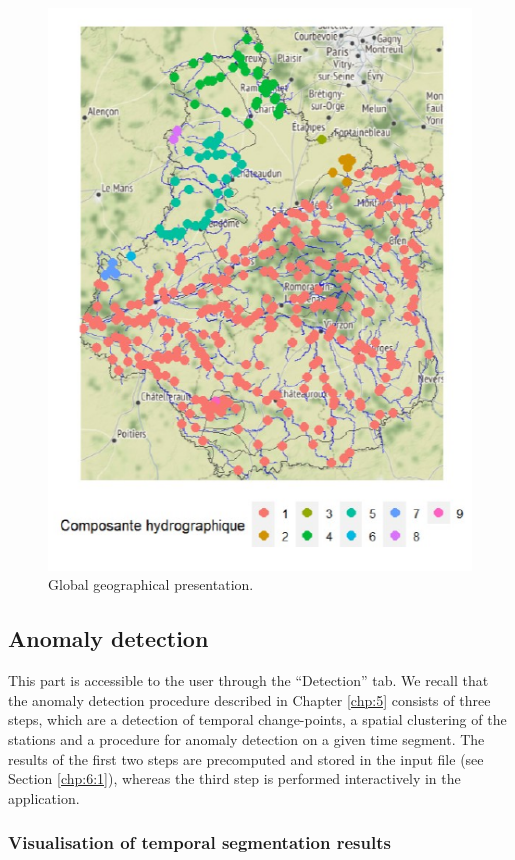 \begin{figure}[htbp]
  \centering
  \includegraphics{figs/Chap6/Im_app2.pdf}
  \caption{Global geographical presentation.}
  \label{fig:Imapp2}
\end{figure}

\subsection{Anomaly detection}\label{chp:6:2:2}

This part is accessible to the user through the ``Detection'' tab. We recall that the anomaly detection procedure described in Chapter \ref{chp:5} consists of three steps, which are a detection of temporal change-points, a spatial clustering of the stations and a procedure for anomaly detection on a given time segment. The results of the first two steps are precomputed and stored in the input file (see Section \ref{chp:6:1}), whereas the third step is performed interactively in the application.

\subsubsection{Visualisation of temporal segmentation results}\label{chp:6:2:temp}

